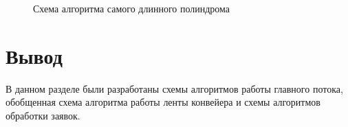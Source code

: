 \begin{figure}
	\caption{Схема алгоритма самого длинного полиндрома}
	\label{getLongestPolinom}
\end{figure}

\newpage
\section{Вывод}
В данном разделе были разработаны схемы алгоритмов работы главного потока, обобщенная схема алгоритма работы ленты конвейера и схемы алгоритмов обработки заявок.